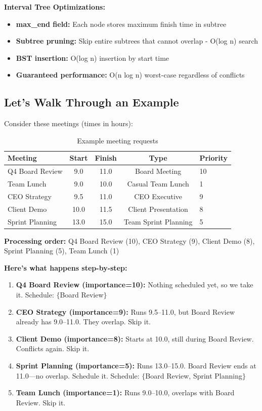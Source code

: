 \documentclass[conference]{IEEEtran}
\begin{document}
\textbf{Interval Tree Optimizations:}
\begin{itemize}
    \item \textbf{max\_end field:} Each node stores maximum finish time in subtree
    \item \textbf{Subtree pruning:} Skip entire subtrees that cannot overlap - O(log n) search
    \item \textbf{BST insertion:} O(log n) insertion by start time
    \item \textbf{Guaranteed performance:} O(n log n) worst-case regardless of conflicts
\end{itemize}

\subsection{Let's Walk Through an Example}

Consider these meetings (times in hours):

\begin{table}[h!]
\centering
\footnotesize
\begin{tabular}{@{}lcccp{1cm}@{}}
\toprule
\textbf{Meeting} & \textbf{Start} & \textbf{Finish} & \textbf{Type} & \textbf{Priority} \\ \midrule
Q4 Board Review & 9.0 & 11.0 & Board Meeting & 10 \\
Team Lunch & 9.0 & 10.0 & Casual Team Lunch & 1 \\
CEO Strategy & 9.5 & 11.0 & CEO Executive & 9 \\
Client Demo & 10.0 & 11.5 & Client Presentation & 8 \\
Sprint Planning & 13.0 & 15.0 & Team Sprint Planning & 5 \\ \bottomrule
\end{tabular}
\newline
\caption{Example meeting requests}
\end{table}

\textbf{Processing order:} Q4 Board Review (10), CEO Strategy (9), Client Demo (8), Sprint Planning (5), Team Lunch (1)

\textbf{Here's what happens step-by-step:}
\begin{enumerate}
    \item \textbf{Q4 Board Review (importance=10):} Nothing scheduled yet, so we take it. Schedule: $\{$Board Review$\}$
    \item \textbf{CEO Strategy (importance=9):} Runs 9.5--11.0, but Board Review already has 9.0--11.0. They overlap. Skip it.
    \item \textbf{Client Demo (importance=8):} Starts at 10.0, still during Board Review. Conflicts again. Skip it.
    \item \textbf{Sprint Planning (importance=5):} Runs 13.0--15.0. Board Review ends at 11.0—no overlap. Schedule it. Schedule: $\{$Board Review, Sprint Planning$\}$
    \item \textbf{Team Lunch (importance=1):} Runs 9.0--10.0, overlaps with Board Review. Skip it.
\end{enumerate}
\end{document}
